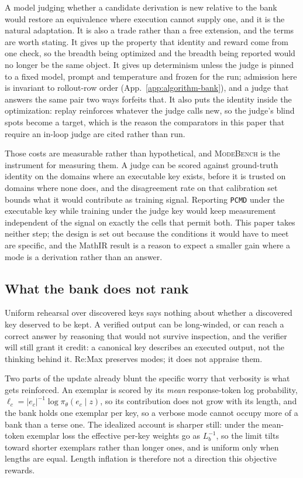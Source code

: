 \documentclass{article}
\newcommand{\1}{\mathbf 1}
\newcommand{\mb}{\textsc{ModeBench}}
\newcommand{\pmd}{\texttt{PCMD}}
\theoremstyle{remark}
\theoremstyle{definition}
\theoremstyle{plain}
\begin{document}
A model judging whether a candidate derivation is new relative to the bank
would restore an equivalence where execution cannot supply one, and it is the
natural adaptation. It is also a trade rather than a free extension, and the
terms are worth stating. It gives up the property that identity and reward
come from one check, so the breadth being optimized and the breadth being
reported would no longer be the same object. It gives up determinism unless
the judge is pinned to a fixed model, prompt and temperature and frozen for
the run; admission here is invariant to rollout-row order
(App.~\ref{app:algorithm-bank}), and a judge that answers the same pair two
ways forfeits that. It also puts the identity inside the optimization: replay
reinforces whatever the judge calls new, so the judge's blind spots become
a target, which is the reason the comparators in this paper that require an
in-loop judge are cited rather than run.

Those costs are measurable rather than hypothetical, and \mb{} is the
instrument for measuring them. A judge can be scored against ground-truth
identity on the domains where an executable key exists, before it is trusted
on domains where none does, and the disagreement rate on that calibration set
bounds what it would contribute as training signal. Reporting \pmd{} under the
executable key while training under the judge key would keep measurement
independent of the signal on exactly the cells that permit both. This paper
takes neither step; the design is set out because the conditions it would have
to meet are specific, and the MathIR result is a reason to expect a smaller
gain where a mode is a derivation rather than an answer.

\subsection{What the bank does not rank}
\label{app:algorithm-quality}

Uniform rehearsal over discovered keys says nothing about whether a discovered
key deserved to be kept. A verified output can be long-winded, or can reach a
correct answer by reasoning that would not survive inspection, and the
verifier will still grant it credit: a canonical key describes an executed
output, not the thinking behind it. Re:Max preserves modes; it does not
appraise them.

Two parts of the update already blunt the specific worry that verbosity is
what gets reinforced. An exemplar is scored by its \emph{mean} response-token
log probability, $\ell_c=|e_c|^{-1}\log\pi_\theta(e_c\mid z)$, so its
contribution does not grow with its length, and the bank holds one exemplar
per key, so a verbose mode cannot occupy more of a bank than a terse one. The
idealized account is sharper still: under the mean-token exemplar loss the
effective per-key weights go as $L_b^{-1}$, so the limit tilts toward shorter
exemplars rather than longer ones, and is uniform only when lengths are equal.
Length inflation is therefore not a direction this objective rewards.
\end{document}
